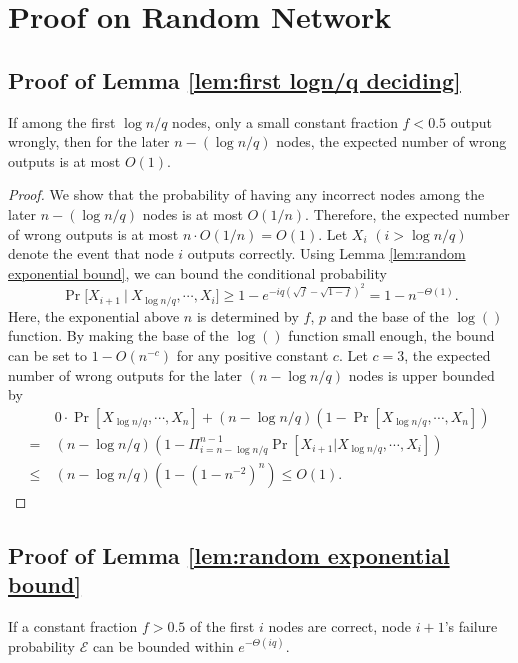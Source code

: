 \documentclass[a4paper,UKenglish]{lipics}
\theoremstyle{definition}
\begin{document}
\clearpage
\appendix
\section{Proof on Random Network}

\subsection{Proof of Lemma \ref{lem:first logn/q deciding}}
\label{subsec:first logn/q deciding}
If among the first $\log n/q$ nodes, 
	only a small constant fraction $f < 0.5$ output wrongly, 
	then for the later $n - (\log n/q)$ nodes, the expected number of wrong outputs is at most $O(1)$.

\begin{proof}
We show that the probability of having any incorrect nodes among the later $n - (\log n/q)$ nodes is at most $O(1/n)$.
Therefore, the expected number of wrong outputs is at most $n\cdot O(1/n) = O(1)$. 
Let $X_i$ $(i > \log n/q)$ denote the event that node $i$ outputs correctly.
Using Lemma \ref{lem:random exponential bound}, we can bound the conditional probability
\begin{equation*}
	\Pr\Big[
		X_{i+1}~\Big|~ X_{\log n/q}, \dotsb, X_{i}
	\Big]
\ge
	1 - e^{-iq(\sqrt{f} - \sqrt{1-f})^2}
=
	1 - n^{-\Theta(1)}.
\end{equation*}
Here, the exponential above $n$ is determined by $f$, $p$ and the base of the $\log()$ function. 
By making the base of the $\log()$ function small enough, the bound can be set to $1 - O(n^{-c})$ for any positive constant $c$.
Let $c = 3$, the expected number of wrong outputs for the later $(n - \log n/q)$ nodes is upper bounded by
\begin{align*}
&
	0\cdot \Pr[X_{\log n/q}, \dotsb, X_n] + (n - \log n/q)(1 - \Pr[X_{\log n/q}, \dotsb, X_n]) \\
=~ & 
	(n - \log n/q)(1 - \Pi_{i = n - \log n/q}^{n-1}\Pr[X_{i+1} | X_{\log n/q}, \dotsb, X_i]) \\
\le~ &
	(n - \log n/q)(1 - (1 - n^{-2})^n)
	\le
	O(1).
\end{align*}
\end{proof}

\subsection{Proof of Lemma \ref{lem:random exponential bound}}
\label{subsec:random exponential bound}

If a constant fraction $f > 0.5$ of the first $i$ nodes are correct, 
	node $i+1$'s failure probability $\mathcal{E}$ can be bounded within $e^{-\Theta(iq)}$. 
\end{document}
